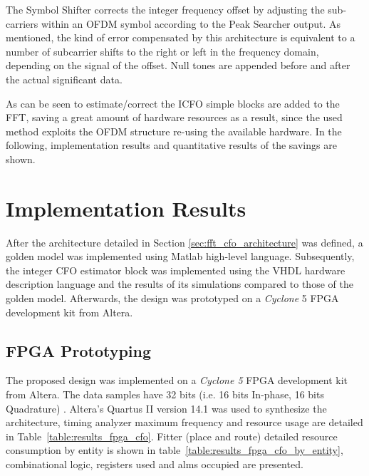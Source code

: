 The Symbol Shifter corrects the integer frequency offset by adjusting
the sub-carriers within an OFDM symbol according to the Peak Searcher 
output. As mentioned, the kind of error compensated by this architecture is
equivalent to a number of subcarrier shifts to the right or left in the frequency 
domain, depending on the signal of the offset. Null tones are appended before and after the actual significant data.

As can be seen to estimate/correct the ICFO simple blocks are added to the FFT, saving a great amount of hardware resources as a result, since the used method exploits the OFDM structure re-using the available hardware. In the following, implementation results and quantitative results of the savings are shown.   

\section{Implementation Results}
\label{sec:results}

 
After the architecture detailed in Section \ref{sec:fft_cfo_architecture} was 
defined, a golden model was implemented using Matlab high-level language. 
Subsequently, the integer CFO estimator block was implemented using the VHDL 
hardware description language and the results of its simulations compared to 
those of the golden model. Afterwards, the design was prototyped on a 
\textit{Cyclone} 5 FPGA development kit from Altera.
 
 
\subsection{FPGA Prototyping}
 
The proposed design was  implemented on a \textit{Cyclone 5} FPGA development kit from Altera. 
The data samples have 32 bits (i.e. 16 bits In-phase, 16 bits 
Quadrature) . Altera's Quartus II version 14.1 was used to synthesize the architecture, timing analyzer maximum frequency and resource usage are detailed in Table~\ref{table:results_fpga_cfo}. Fitter (place and route) detailed resource consumption by entity is shown in table~\ref{table:results_fpga_cfo_by_entity}, combinational logic, registers used and \ac{alm}s occupied are presented.
 
